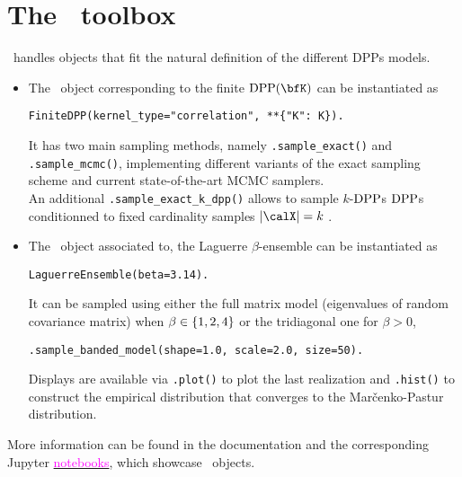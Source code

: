 \documentclass[twoside,11pt]{article}
\begin{document}


\section{The \DPPy\ toolbox} %
\label{sec:the_dppy_toolbox}

  \lstset{language=mypython}

  \DPPy\ handles objects that fit the natural definition of the different DPPs models.
  \begin{itemize}
      \item The \DPPy\ object corresponding to the finite $\DPP(\bfK)$ can be instantiated as
      \begin{lstlisting}[aboveskip=5pt,
                      belowskip=-1pt,
                      xleftmargin=.1\textwidth,
                      xrightmargin=.2\textwidth]
        FiniteDPP(kernel_type="correlation", **{"K": K}).
      \end{lstlisting}
    It has two main sampling methods, namely
    \lstinline{.sample_exact()} and
    \lstinline{.sample_mcmc()},
    implementing different variants of the exact sampling scheme and current state-of-the-art MCMC samplers.\\
    An additional
    \lstinline{.sample_exact_k_dpp()}
    allows to sample $k$-$\operatorname{DPP}$s \ie $\operatorname{DPP}$s conditionned to fixed cardinality samples $|\calX|=k$ \citep[Section 5]{KuTa12}.

        \item The \DPPy\ object associated to, \eg the Laguerre $\beta$-ensemble can be instantiated as
    \begin{lstlisting}[aboveskip=5pt,
                      belowskip=-1pt,
                      xleftmargin=.2\textwidth,
                      xrightmargin=.2\textwidth]
      LaguerreEnsemble(beta=3.14).
    \end{lstlisting}
    It can be sampled using either the full matrix model (eigenvalues of random covariance matrix) when $\beta\in\left\{ 1,2,4 \right\}$ or the tridiagonal one for $\beta > 0$,
      \begin{lstlisting}[aboveskip=5pt,
                      belowskip=-1pt,
                      xleftmargin=.1\textwidth,
                      xrightmargin=.2\textwidth]
      .sample_banded_model(shape=1.0, scale=2.0, size=50).
      \end{lstlisting}
    Displays are available via
    \lstinline{.plot()} to plot the last realization and
    \lstinline{.hist()} to construct the empirical distribution that converges to the Mar\v{c}enko-Pastur distribution.
  \end{itemize}
  More information can be found in the documentation and the corresponding Jupyter \href{https://github.com/guilgautier/DPPy/tree/master/notebooks}{\textcolor{magenta}{notebooks}}, which showcase \DPPy\ objects.
\end{document}
